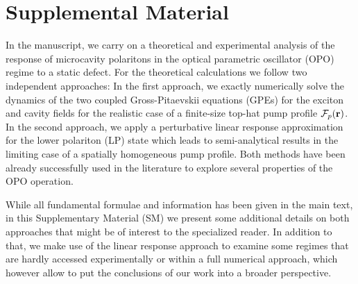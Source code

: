 \section{Supplemental Material}


In the manuscript, we carry on a theoretical and experimental analysis
of the response of microcavity polaritons in the optical parametric
oscillator (OPO) regime to a static defect.
%
For the theoretical calculations we follow two independent approaches:
In the first approach, we exactly numerically solve the dynamics of
the two coupled Gross-Pitaevskii equations (GPEs) for the exciton and
cavity fields for the realistic case of a finite-size top-hat pump
profile $\mathcal{F}_p(\mathbf{r})$. In the second approach, we apply a
perturbative linear response approximation for the lower polariton
(LP) state which leads to semi-analytical results in the limiting case
of a spatially homogeneous pump profile. Both methods have been
already successfully used in the literature to explore several
properties of the OPO operation.

While all fundamental formulae and information has been given in the
main text, in this Supplementary Material (SM) we present some
additional details on both approaches that might be of interest to the
specialized reader.  In addition to that, we make use of the linear
response approach to examine some regimes that are hardly accessed
experimentally or within a full numerical approach, which however
allow to put the conclusions of our work into a broader perspective.


